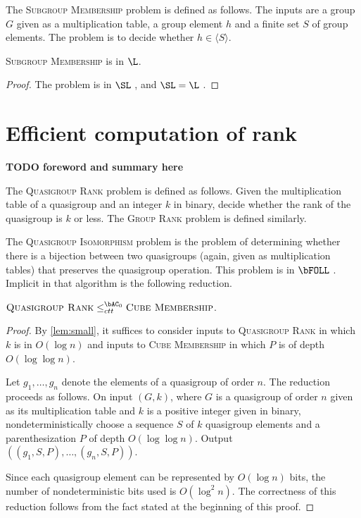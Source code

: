 \documentclass{article}
\newcommand{\todo}[1]{\textbf{TODO #1}}
\newcommand{\gen}[1]{\langle #1 \rangle}
\begin{document}
The \textsc{Subgroup Membership} problem is defined as follows.
The inputs are a group $G$ given as a multiplication table, a group element $h$ and a finite set $S$ of group elements.
The problem is to decide whether $h \in \gen{S}$.

\begin{lemma}\label{lem:subgroupmem}
  \textsc{Subgroup Membership} is in $\L$.
\end{lemma}
\begin{proof}
  The problem is in $\SL$ \autocite[Section~3]{bm89}, and $\SL = \L$ \cite{reingold08}.
\end{proof}

\section{Efficient computation of rank}

\todo{foreword and summary here}

The \textsc{Quasigroup Rank} problem is defined as follows.
Given the multiplication table of a quasigroup and an integer $k$ in binary, decide whether the rank of the quasigroup is $k$ or less.
The \textsc{Group Rank} problem is defined similarly.

The \textsc{Quasigroup Isomorphism} problem is the problem of determining whether there is a bijection between two quasigroups (again, given as multiplication tables) that preserves the quasigroup operation.
This problem is in $\bFOLL$ \autocite[Theorem~3.4]{ctw13}.
Implicit in that algorithm is the following reduction.

\begin{lemma}\label{lem:qranktomem}
  $\textsc{Quasigroup Rank} \leq^{\bAC_0}_{ctt} \textsc{Cube Membership}$.
\end{lemma}
\begin{proof}
  By \autoref{lem:small}, it suffices to consider inputs to \textsc{Quasigroup Rank} in which $k$ is in $O(\log n)$ and inputs to \textsc{Cube Membership} in which $P$ is of depth $O(\log \log n)$.

  Let $g_1, \dotsc, g_n$ denote the elements of a quasigroup of order $n$.
  The reduction proceeds as follows.
  On input $(G, k)$, where $G$ is a quasigroup of order $n$ given as its multiplication table and $k$ is a positive integer given in binary, nondeterministically choose a sequence $S$ of $k$ quasigroup elements and a parenthesization $P$ of depth $O(\log \log n)$.
  Output $((g_1, S, P), \dotsc, (g_n, S, P))$.

  Since each quasigroup element can be represented by $O(\log n)$ bits, the number of nondeterministic bits used is $O(\log^2 n)$.
  The correctness of this reduction follows from the fact stated at the beginning of this proof.
\end{proof}
\end{document}
